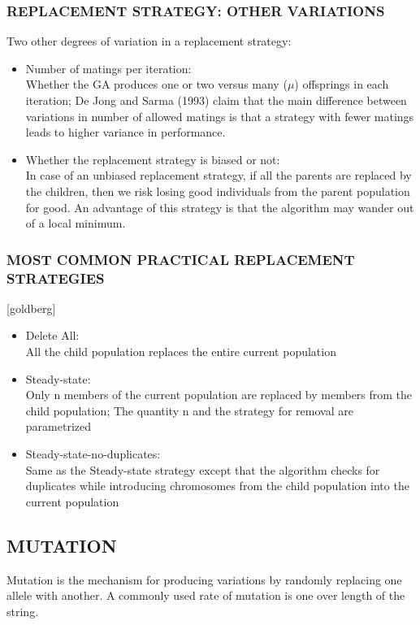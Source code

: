 \documentclass[12pt,a4paper]{article}
\begin{document}
	\subsubsection{REPLACEMENT STRATEGY: OTHER VARIATIONS}
	Two other degrees of variation in a replacement strategy:
	\begin{itemize}
	\item Number of matings per iteration: \\
	Whether the GA produces one or two versus many ($\mu$) offsprings in each iteration; De Jong and Sarma (1993) claim that the main difference between variations in number of allowed matings is that a strategy with fewer matings leads to higher variance in performance.
	\item Whether the replacement strategy is biased or not: \\
	In case of an unbiased replacement strategy, if all the parents are replaced by the children, then we risk losing good individuals from the parent population for good. An advantage of this strategy is that the algorithm may wander out of a local minimum.
	\end{itemize}
	
	\subsubsection{MOST COMMON PRACTICAL REPLACEMENT STRATEGIES}[goldberg]
	\begin{itemize}
	\item Delete All: \\
	All the child population replaces the entire current population
	\item Steady-state: \\
	Only n members of the current population are replaced by members from the child population; The quantity n and the strategy for removal are parametrized
	\item Steady-state-no-duplicates: \\
	Same as the Steady-state strategy except that the algorithm checks for duplicates while introducing chromosomes from the child population into the current population
	\end{itemize}

	\subsection{MUTATION}
	Mutation is the mechanism for producing variations by randomly replacing one allele with another. A commonly used rate of mutation is one over length of the string.
\end{document}
